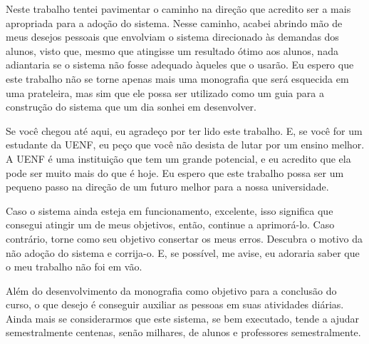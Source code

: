Neste trabalho tentei pavimentar o caminho na direção que acredito ser a mais apropriada para a adoção do sistema. Nesse caminho, acabei abrindo mão de meus desejos pessoais que envolviam o sistema direcionado às demandas dos alunos, visto que, mesmo que atingisse um resultado ótimo aos alunos, nada adiantaria se o sistema não fosse adequado àqueles que o usarão. Eu espero que este trabalho não se torne apenas mais uma monografia que será esquecida em uma prateleira, mas sim que ele possa ser utilizado como um guia para a construção do sistema que um dia sonhei em desenvolver.

Se você chegou até aqui, eu agradeço por ter lido este trabalho. E, se você for um estudante da UENF, eu peço que você não desista de lutar por um ensino melhor. A UENF é uma instituição que tem um grande potencial, e eu acredito que ela pode ser muito mais do que é hoje. Eu espero que este trabalho possa ser um pequeno passo na direção de um futuro melhor para a nossa universidade.

Caso o sistema ainda esteja em funcionamento, excelente, isso significa que consegui atingir um de meus objetivos, então, continue a aprimorá-lo. Caso contrário, torne como seu objetivo consertar os meus erros. Descubra o motivo da não adoção do sistema e corrija-o. E, se possível, me avise, eu adoraria saber que o meu trabalho não foi em vão.

Além do desenvolvimento da monografia como objetivo para a conclusão do curso, o que desejo é conseguir auxiliar as pessoas em suas atividades diárias. Ainda mais se considerarmos que este sistema, se bem executado, tende a ajudar semestralmente centenas, senão milhares, de alunos e professores semestralmente.
